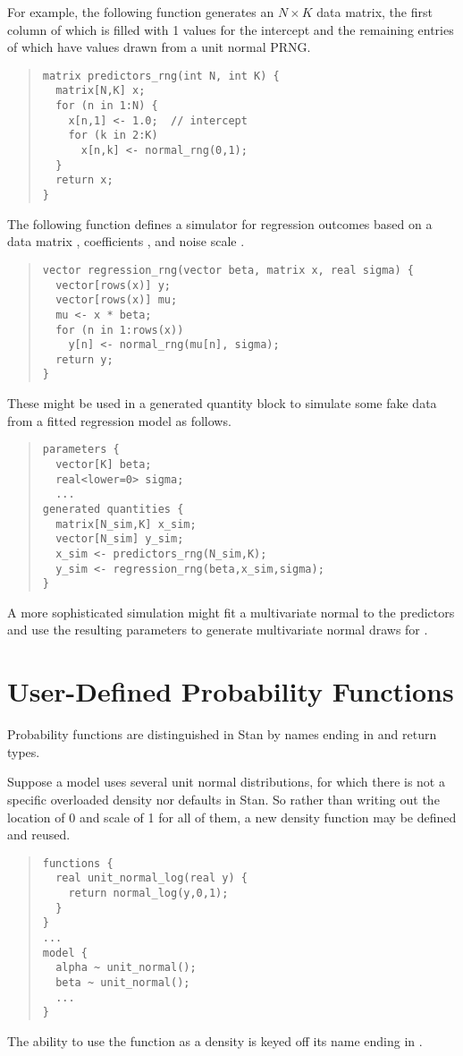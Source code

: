 For example, the following function generates an $N \times K$ data
matrix, the first column of which is filled with 1 values for the
intercept and the remaining entries of which have values drawn
from a unit normal PRNG.
%
\begin{quote}
\begin{Verbatim}
matrix predictors_rng(int N, int K) {
  matrix[N,K] x;
  for (n in 1:N) {
    x[n,1] <- 1.0;  // intercept
    for (k in 2:K)
      x[n,k] <- normal_rng(0,1);
  }
  return x;
}
\end{Verbatim}
\end{quote}
%
The following function defines a simulator for regression outcomes
based on a data matrix , coefficients , and noise
scale .
%
\begin{quote}
\begin{Verbatim}
vector regression_rng(vector beta, matrix x, real sigma) {
  vector[rows(x)] y;
  vector[rows(x)] mu;
  mu <- x * beta;
  for (n in 1:rows(x))
    y[n] <- normal_rng(mu[n], sigma);
  return y;
}
\end{Verbatim}
\end{quote}
%
These might be used in a generated quantity block to simulate some
fake data from a fitted regression model as follows.
%
\begin{quote}
\begin{Verbatim}
parameters {
  vector[K] beta;
  real<lower=0> sigma;
  ...
generated quantities {
  matrix[N_sim,K] x_sim;
  vector[N_sim] y_sim;
  x_sim <- predictors_rng(N_sim,K);
  y_sim <- regression_rng(beta,x_sim,sigma);
}
\end{Verbatim}
\end{quote}
%
A more sophisticated simulation might fit a multivariate normal to the
predictors  and use the resulting parameters to generate
multivariate normal draws for .

\section{User-Defined Probability Functions}

Probability functions are distinguished in Stan by names ending in
 and  return types.  

Suppose a model uses several unit normal distributions, for which
there is not a specific overloaded density nor defaults in Stan.  So
rather than writing out the location of 0 and scale of 1 for all of
them, a new density function may be defined and reused.
%
\begin{quote}
\begin{Verbatim}
functions {
  real unit_normal_log(real y) { 
    return normal_log(y,0,1); 
  }
}
...
model {
  alpha ~ unit_normal();
  beta ~ unit_normal();
  ...
}
\end{Verbatim}
\end{quote}
%
The ability to use the  function as a density is
keyed off its name ending in .  

